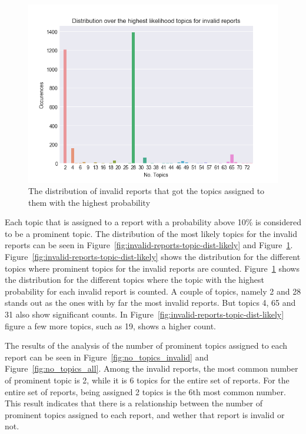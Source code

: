 \begin{figure}
    \centering
    \includegraphics[scale=0.8]{figures/distribution_invalid_reports_highest_likelihood.png}
    \caption{The distribution of invalid reports that got the topics assigned to them with the highest probability}
    \label{fig:invalid-reports-topic-dist-likeliest}
\end{figure}

Each topic that is assigned to a report with a probability above 10\% is considered to be a prominent topic.
The distribution of the most likely topics for the invalid reports can be seen in Figure~\ref{fig:invalid-reports-topic-dist-likely} and Figure~\ref{fig:invalid-reports-topic-dist-likeliest}.
Figure~\ref{fig:invalid-reports-topic-dist-likely} shows the distribution for the different topics where prominent topics for the invalid reports are counted.
Figure~\ref{fig:invalid-reports-topic-dist-likeliest} shows the distribution for the different topics where the topic with the highest probability for each invalid report is counted.
A couple of topics, namely 2 and 28 stands out as the ones with by far the most invalid reports.
But topics 4, 65 and 31 also show significant counts.
In Figure~\ref{fig:invalid-reports-topic-dist-likely} figure a few more topics, such as 19, shows a higher count.

The results of the analysis of the number of prominent topics assigned to each report can be seen in Figure~\ref{fig:no_topics_invalid} and Figure~\ref{fig:no_topics_all}.
Among the invalid reports, the most common number of prominent topic is 2, while it is 6 topics for the entire set of reports.
For the entire set of reports, being assigned 2 topics is the 6th most common number.
This result indicates that there is a relationship between the number of prominent topics assigned to each report, and wether that report is invalid or not.

